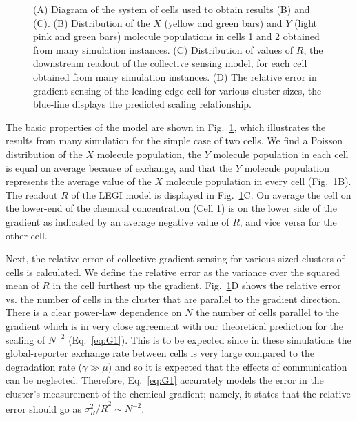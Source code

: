 \documentclass[phys,prelim]{puthesis}
\begin{document}
\begin{figure}[ht]
    \centering
    \caption{(A) Diagram of the system of cells used to obtain results (B) and (C). (B) Distribution of the $X$ (yellow and green bars) and $Y$ (light pink and green bars) molecule populations in cells 1 and 2 obtained from many simulation instances. (C) Distribution of values of $R$, the downstream readout of the collective sensing model, for each cell obtained from many simulation instances. (D) The relative error in gradient sensing of the leading-edge cell for various cluster sizes, the blue-line displays the predicted scaling relationship.} \label{fig:sense1}
\end{figure}

The basic properties of the model are shown in Fig.\ \ref{fig:sense1}, which illustrates the results from many simulation for the simple case of two cells. We find a Poisson distribution of the $X$ molecule population, the $Y$ molecule population in each cell is equal on average because of exchange, and that the $Y$ molecule population represents the average value of the $X$ molecule population in every cell (Fig.\ \ref{fig:sense1}B). The readout $R$ of the LEGI model is displayed in Fig.\ \ref{fig:sense1}C. On average the cell on the lower-end of the chemical concentration (Cell 1) is on the lower side of the gradient as indicated by an average negative value of $R$, and vice versa for the other cell.

Next, the relative error of collective gradient sensing for various sized clusters of cells is calculated. We define the relative error as the variance over the squared mean of $R$ in the cell furthest up the gradient. Fig.\ \ref{fig:sense1}D shows the relative error vs. the number of cells in the cluster that are parallel to the gradient direction. There is a clear power-law dependence on $N$ the number of cells parallel to the gradient which is in very close agreement with our theoretical prediction for the scaling of $N^{-2}$ (Eq.\ \ref{eq:G1}). This is to be expected since in these simulations the global-reporter exchange rate between cells is very large compared to the degradation rate ($\gamma\gg\mu$) and so it is expected that the effects of communication can be neglected. Therefore, Eq.\ \ref{eq:G1} accurately models the error in the cluster's measurement of the chemical gradient; namely, it states that the relative error should go as $\sigma_R^2/\bar{R}^2 \sim N^{-2}$.
\end{document}
